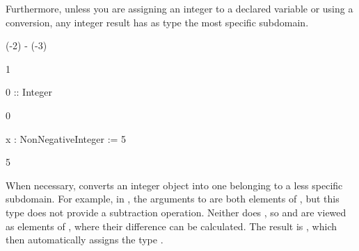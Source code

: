 \begin{xtc}
\begin{xtccomment}
Furthermore, unless you are assigning an integer to a declared variable
or using a conversion, any integer result has as type the most
specific subdomain.
\end{xtccomment}
\begin{spadsrc}
(-2) - (-3)
\end{spadsrc}
\begin{TeXOutput}
\begin{fricasmath}{4}
1%
\end{fricasmath}
\end{TeXOutput}
\end{xtc}
\begin{xtc}
\begin{xtccomment}
\end{xtccomment}
\begin{spadsrc}
0 :: Integer
\end{spadsrc}
\begin{TeXOutput}
\begin{fricasmath}{5}
0%
\end{fricasmath}
\end{TeXOutput}
\end{xtc}
\begin{xtc}
\begin{xtccomment}
\end{xtccomment}
\begin{spadsrc}
x : NonNegativeInteger := 5
\end{spadsrc}
\begin{TeXOutput}
\begin{fricasmath}{6}
5%
\end{fricasmath}
\end{TeXOutput}
\end{xtc}

When necessary, \Language{} converts an integer object into one belonging
to a less specific subdomain.
For example, in , the arguments to  are both
elements of , but this type does not provide
a subtraction operation.
Neither does , so  and 
are viewed as elements of , where their difference
can be calculated.
The result is , which \Language{} then automatically assigns
the type .

